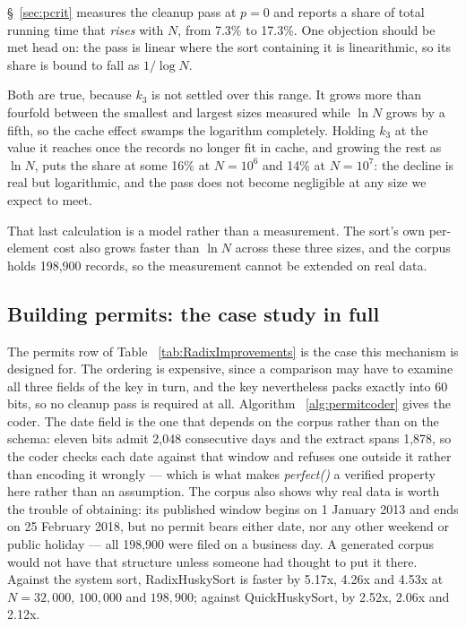 \documentclass[twoside,leqno,twocolumn]{article}
\begin{document}
\S~\ref{sec:pcrit} measures the cleanup pass at $p = 0$ and reports a share of total running time that
\emph{rises} with $N$, from 7.3\% to 17.3\%.
One objection should be met head on: the pass is linear where the sort containing it is linearithmic,
so its share is bound to fall as $1/\log N$.

Both are true, because $k_3$ is not settled over this range.
It grows more than fourfold between the smallest and largest sizes measured while $\ln N$ grows by a
fifth, so the cache effect swamps the logarithm completely.
Holding $k_3$ at the value it reaches once the records no longer fit in cache, and growing the rest as
$\ln N$, puts the share at some 16\% at $N = 10^{6}$ and 14\% at $N = 10^{7}$:
the decline is real but logarithmic, and the pass does not become negligible at any size we expect to meet.

That last calculation is a model rather than a measurement.
The sort's own per-element cost also grows faster than $\ln N$ across these three sizes,
and the corpus holds 198,900 records, so the measurement cannot be extended on real data.

\subsection{Building permits: the case study in full}
\label{sec:permits}

The permits row of Table ~\ref{tab:RadixImprovements} is the case this mechanism is designed for.
The ordering is expensive, since a comparison may have to examine all three fields of the key in turn,
and the key nevertheless packs exactly into 60 bits, so no cleanup pass is required at all.
Algorithm ~\ref{alg:permitcoder} gives the coder.
The date field is the one that depends on the corpus rather than on the schema: eleven bits admit 2,048
consecutive days and the extract spans 1,878, so the coder checks each date against that window and
refuses one outside it rather than encoding it wrongly ---
which is what makes \textit{perfect()} a verified property here rather than an assumption.
The corpus also shows why real data is worth the trouble of obtaining: its published window begins on
1 January 2013 and ends on 25 February 2018, but no permit bears either date, nor any other weekend or
public holiday --- all 198,900 were filed on a business day.
A generated corpus would not have that structure unless someone had thought to put it there.
Against the system sort, RadixHuskySort is faster by 5.17x, 4.26x and 4.53x at $N = 32{,}000$,
$100{,}000$ and $198{,}900$; against QuickHuskySort, by 2.52x, 2.06x and 2.12x.
\end{document}
